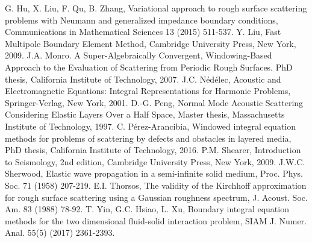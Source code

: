 \documentclass[10pt]{article}
\numberwithin{equation}{section}
\begin{document}
\begin{thebibliography}{00}
 G. Hu, X. Liu, F. Qu, B. Zhang, Variational approach to rough surface scattering problems with  Neumann and generalized impedance boundary conditions, Communications in Mathematical Sciences 13 (2015) 511-537.
 Y. Liu, Fast Multipole Boundary Element Method, Cambridge University Press, New York, 2009.
 J.A. Monro. A Super-Algebraically Convergent, Windowing-Based Approach to the Evaluation of Scattering from Periodic Rough Surfaces. PhD thesis, California Institute of Technology, 2007.
 J.C. N\'{e}d\'{e}lec, Acoustic and Electromagnetic Equations: Integral Representations for Harmonic Problems, Springer-Verlag, New York, 2001.
 D.-G. Peng, Normal Mode Acoustic Scattering Considering Elastic Layers Over a Half Space, Master thesis, Massachusetts Institute of Technology, 1997.
 C. P\'erez-Arancibia, Windowed integral equation methods for problems of scattering by defects and obstacles in layered media, PhD thesis, California Institute of Technology, 2016.
 P.M. Shearer, Introduction to Seismology, 2nd edition, Cambridge University Press, New York, 2009.
 J.W.C. Sherwood, Elastic wave propagation in a semi-infinite solid medium, Proc. Phys. Soc. 71 (1958) 207-219.
 E.I. Thorsos, The validity of the Kirchhoff approximation for rough surface scattering using a Gaussian roughness spectrum, J. Acoust. Soc. Am. 83 (1988) 78-92.
 T. Yin, G.C. Hsiao, L. Xu, Boundary integral equation methods for the two dimensional fluid-solid interaction problem, SIAM J. Numer. Anal. 55(5) (2017) 2361-2393.
\end{thebibliography}
\end{document}
